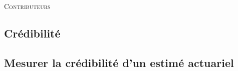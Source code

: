\documentclass[10pt, french]{article}
\begin{document}
\begin{center}
	\textsc{\Large Contributeurs}\\[0.5cm] 
\end{center}


\newpage

\begin{multicols*}{2}






\section{Crédibilité}

\subsection{Mesurer la crédibilité d'un estimé actuariel}







\end{multicols*}
\end{document}
